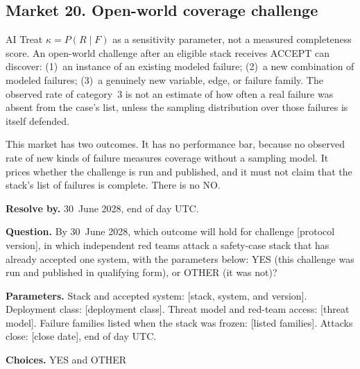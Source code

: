 \subsection{Market 20. Open-world coverage challenge}
\label{sec:appp-m20}
\begin{authbar}{AI}
Treat $\kappa = P(R\mid F)$ as a sensitivity parameter, not a measured completeness score.
An open-world challenge after an eligible stack receives ACCEPT can discover:
(1)~an instance of an existing modeled failure;
(2)~a new combination of modeled failures;
(3)~a genuinely new variable, edge, or failure family.
The observed rate of category~3 is not an estimate of how often a real failure was absent from the case's list, unless the sampling distribution over those failures is itself defended.

This market has two outcomes.
It has no performance bar, because no observed rate of new kinds of failure measures coverage without a sampling model.
It prices whether the challenge is run and published, and it must not claim that the stack's list of failures is complete.
There is no NO.

\end{authbar}
\begin{predictionbox}
\textbf{Resolve by.} 30~June 2028, end of day UTC.

\textbf{Question.}
By 30~June 2028, which outcome will hold for challenge [protocol version], in which independent red teams attack a safety-case stack that has already accepted one system, with the parameters below: YES (this challenge was run and published in qualifying form), or OTHER (it was not)?

\textbf{Parameters.}
Stack and accepted system: [stack, system, and version].
Deployment class: [deployment class].
Threat model and red-team access: [threat model].
Failure families listed when the stack was frozen: [listed families].
Attacks close: [close date], end of day UTC.

\textbf{Choices.} YES and OTHER 
\end{predictionbox}


